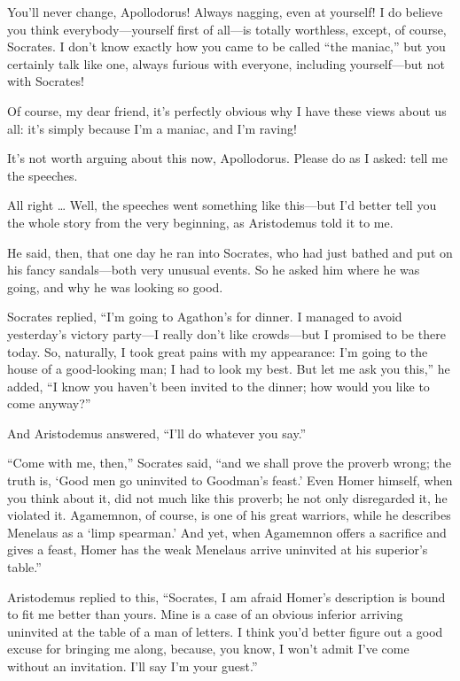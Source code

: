 \sayfriend You'll never change, Apollodorus! Always nagging, even at
yourself! I do believe you think everybody---yourself first of all---is
totally worthless, except, of course, Socrates. I don't know exactly how
you came to be called “the maniac,” but you certainly talk like one,
always furious with everyone, including yourself---but not with
Socrates!

\sayapollodorus Of course, my dear friend, it's perfectly obvious why I 
have these views about us all: it's simply because I'm a maniac,
and I'm raving!

\sayfriend It's not worth arguing about this now, Apollodorus. Please do as
I asked: tell me the speeches.

\sayapollodorus All right \ldots{} Well, the speeches went something like
this---but I'd better tell you the whole story from the very beginning,
as Aristodemus told it to me.

He said, then, that one day he ran into Socrates, who had just bathed
and put on his fancy sandals---both very unusual events. So he asked him
where he was going, and why he was looking so good.

Socrates replied, “I'm going to Agathon's for dinner. I managed to avoid
yesterday's victory party---I really don't like crowds---but I promised
to be there today. So, naturally, I took great pains with my appearance:
I'm going to the house of a good-looking man; I had to look my best. But
let me ask you this,” he added, “I know you haven't been invited to the
dinner; how would you like to come anyway?”

And Aristodemus answered, “I'll do whatever you say.”

“Come with me, then,” Socrates said, “and we shall prove the proverb
wrong; the truth is, ‘Good men go uninvited to Goodman's
feast.' Even Homer
himself, when you think about it, did not much like this proverb;
he not only disregarded it, he violated it. Agamemnon, of
course, is one of his great warriors, while he describes Menelaus as a
‘limp spearman.' And yet, when Agamemnon offers a sacrifice and gives a
feast, Homer has the weak Menelaus arrive uninvited at his superior's
table.”

Aristodemus replied to this, “Socrates, I am afraid Homer's description
is bound to fit me better than yours. Mine is a case of an obvious
inferior arriving uninvited at the table of a man of letters. I think
you'd better figure out a good excuse for bringing me along, because,
you know, I  won't admit I've come without an invitation. I'll
say I'm your guest.”

